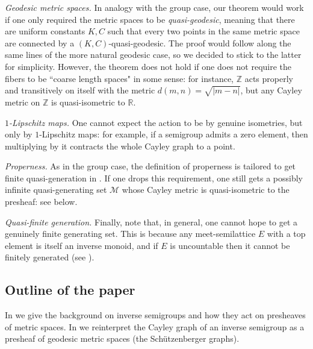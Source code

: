 \documentclass[svgnames]{amsart}
\theoremstyle{plain}
\theoremstyle{definition}
\newcommand{\Z}{\mathbb{Z}}
\newcounter{fcomments}
\newcommand{\fra}[1]{\textbf{\color{red}(F\arabic{fcomments})} \marginpar{\scriptsize\raggedright\textbf{\color{red}(F\arabic{fcomments})Francesco: }#1}
	\addtocounter{fcomments}{1}}
\begin{document}
\textit{Geodesic metric spaces.} In analogy with the group case, our theorem would work if one only required the metric spaces to be \emph{quasi-geodesic}, meaning that there are uniform constants $K,C$ such that every two points in the same metric space are connected by a $(K,C)$-quasi-geodesic. The proof would follow along the same lines of the more natural geodesic case, so we decided to stick to the latter for simplicity. However, the theorem does not hold if one does not require the fibers to be ``coarse length spaces" in some sense: for instance, $\Z$ acts properly and transitively on itself with the metric $d(m,n)=\sqrt{|m-n|}$, but any Cayley metric on $\Z$ is quasi-isometric to $\mathbb{R}$. 

\textit{$1$-Lipschitz maps.} One cannot expect the action to be by genuine isometries, but only by $1$-Lipschitz maps: for example, if a semigroup admits a zero element, then multiplying by it contracts the whole Cayley graph to a point. 

\textit{Properness.} As in the group case, the definition of properness is tailored to get finite quasi-generation in .
If one drops this requirement, one still gets a possibly infinite quasi-generating set $\mathcal M$ whose Cayley metric is quasi-isometric to the presheaf: see  below.

\textit{Quasi-finite generation.} Finally, note that, in general, one cannot hope to get a genuinely finite generating set. This is because any meet-semilattice $E$ with a top element is itself an inverse monoid, and if $E$ is uncountable then it cannot be finitely generated (see ).



\subsection*{Outline of the paper}
In  we give the background on inverse semigroups and how they act on presheaves of metric spaces. In 
we reinterpret the Cayley graph of an inverse semigroup as a presheaf of geodesic metric spaces (the Sch\"{u}tzenberger graphs).
\end{document}
